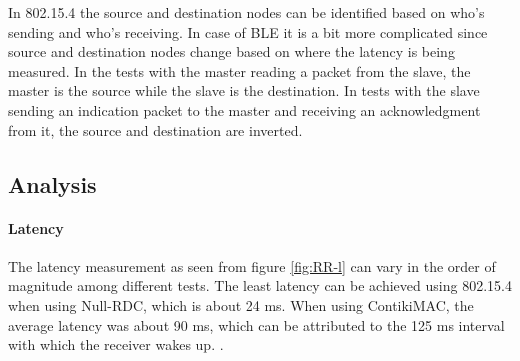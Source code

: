 In 802.15.4 the source and destination nodes can be identified based on who's sending and who's receiving. In case of BLE it is a bit more complicated since source and destination nodes change based on where the latency is being measured. In the tests with the master reading a packet from the slave, the master is the source while the slave is the destination. In tests with the slave sending an indication packet to the master and receiving an acknowledgment from it, the source and destination are inverted.

\subsection{Analysis}
\paragraph{Latency}
The latency measurement as seen from figure \ref{fig:RR-l} can vary in the order of magnitude among different tests. The least latency can be achieved using 802.15.4 when using Null-RDC, which is about 24 ms.  When using ContikiMAC, the average latency was about 90 ms, which can be attributed to the 125 ms interval with which the receiver wakes up. .  

